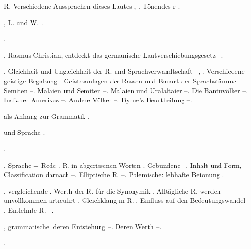 \begin{register}
R. Verschiedene Aussprachen dieses Lautes \pageref{sp.36}, \pageref{sp.37}. Tönendes r \pageref{sp.186}.

, L. und W. \pageref{sp.69}.

 \pageref{sp.147}.

, Rasmus Christian, entdeckt das germanische Lautverschiebungsgesetz \pageref{sp.26}–\pageref{sp.27}.

. Gleichheit und Ungleichheit der R. und Sprachverwandtschaft \pageref{sp.147}–\pageref{sp.148}, \pageref{sp.178}. Verschiedene geistige Begabung \pageref{sp.395}. Geistesanlagen der Rassen und Bauart der Sprachstämme \pageref{sp.407}. Semiten \pageref{sp.408}–\pageref{sp.411}. Malaien und Semiten \pageref{sp.411}–\pageref{sp.415}. Malaien und Uralaltaier \pageref{sp.415}–\pageref{sp.420}. Die Bantuvölker \pageref{sp.420}–\pageref{sp.423}. Indianer Amerikas \pageref{sp.423}–\pageref{sp.425}. Andere Völker \pageref{sp.425}–\pageref{sp.426}. Byrne’s Beurtheilung \pageref{sp.426}–\pageref{sp.427}.

 als Anhang zur Grammatik \pageref{sp.107}.

 und Sprache \pageref{sp.17}.

 \pageref{sp.102}.


. Sprache = Rede \pageref{sp.3}\sed{, \pageref{sp.59}}. R. in abgerissenen Worten \pageref{sp.182}. Gebundene \pageref{sp.225}–\pageref{sp.227}. Inhalt und Form, Classification darnach \pageref{sp.317}–\pageref{sp.324}. Elliptische R. \pageref{sp.367}–\pageref{sp.368}. Polemische: lebhafte Betonung \pageref{sp.374}.


, vergleichende \pageref{sp.42}. Werth der R. für die Synonymik \pageref{sp.100}. Alltägliche R. werden unvollkommen articulirt \pageref{sp.182}. Gleichklang in R. \pageref{sp.222}. Einfluss auf den Bedeutungswandel \pageref{sp.234}. Entlehnte R. \pageref{sp.270}–\pageref{sp.273}.

, grammatische, deren Entstehung \pageref{sp.381}–\pageref{sp.385}. Deren Werth \pageref{sp.438}–\pageref{sp.442}.

 \pageref{sp.102}.



\end{register}
